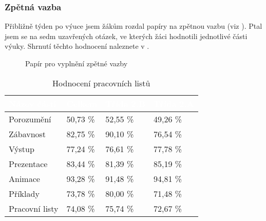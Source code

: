 \subsubsection{Zpětná vazba}
{Přibližně týden po výuce jsem žákům rozdal papíry na zpětnou vazbu (viz ). Ptal jsem se na sedm uzavřených otázek, ve kterých žáci hodnotili jednotlivé části výuky. Shrnutí těchto hodnocení naleznete v .}\\
\begin{minipage}{0.35\textwidth}
    \begin{figure}[H]
        \centering
        \setlength{\fboxsep}{0pt}
        \caption{Papír pro vyplnění zpětné vazby \jaObr}
        \label{obr:papirZpetnaVazba}
    \end{figure}
\end{minipage}\hfill
\begin{minipage}{0.6\textwidth}
    \renewcommand{\arraystretch}{1.25}
    \begin{table}[H]
        \begin{tabular}{|p{2.5cm}|p{1.7cm}|p{1.7cm}|p{1.7cm}|}
            \hline
            \rowcolor{black!60}
            \textcolor{white}{Název části} & \textcolor{white}{Celkem} & \textcolor{white}{Třída 2.B} & \textcolor{white}{Třída 2.A}\\
            \hline
            Porozumění & \hfill 50,73 \% & \hfill 52,55 \% & \hfill 49,26 \% \\
            \hline
            Zábavnost & \hfill 82,75 \% & \hfill 90,10 \% & \hfill 76,54 \% \\
            \hline
            Výstup & \hfill 77,24 \% & \hfill 76,61 \% & \hfill 77,78 \% \\
            \hline
            Prezentace & \hfill 83,44 \% & \hfill 81,39 \% & \hfill 85,19 \% \\
            \hline
            Animace & \hfill 93,28 \% & \hfill 91,48 \% & \hfill 94,81 \% \\
            \hline
            Příklady & \hfill 73,78 \% & \hfill 80,00 \% & \hfill 71,48 \% \\
            \hline
            Pracovní listy & \hfill 74,08 \% & \hfill 75,74 \% & \hfill 72,67 \% \\
            \hline
        \end{tabular}
        \caption{Hodnocení pracovních listů \jaTab}
        \label{tab:zpetnaVazba}
    \end{table}
\end{minipage}\odst
